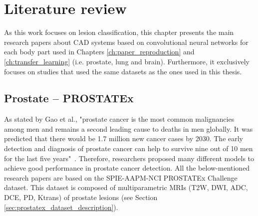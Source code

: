 
\chapter{Literature review}
\label{ch:literature_review}
\setlength{\marginparwidth}{3cm}\leavevmode {}As this work focuses on lesion classification, this chapter presents the main research papers about CAD systems based on convolutional neural networks for each body part used in Chapters \ref{ch:paper_reproduction} and \ref{ch:transfer_learning} (i.e. prostate, lung and brain). Furthermore, it exclusively focuses on studies that used the same datasets as the ones used in this thesis.

\section{Prostate -- PROSTATEx}

\setlength{\marginparwidth}{3cm}\leavevmode {}As stated by Gao et al., "prostate  cancer  is  the  most  common  malignancies  among  men  and  remains  a  second  leading  cause to deaths in men globally. It was predicted that there would be 1.7 million new cancer cases by 2030. The early detection and diagnosis of prostate cancer can help to survive nine out of 10 men for the last five years"~\cite{41}. Therefore, researchers proposed many different models to achieve good performance in prostate cancer detection. All the below-mentioned research papers are based on the SPIE-AAPM-NCI PROSTATEx Challenge dataset. This dataset is composed of multiparametric MRIs (T2W, DWI, ADC, DCE, PD, Ktrans) of prostate lesions (see Section \ref{sec:prostatex_dataset_description}).

